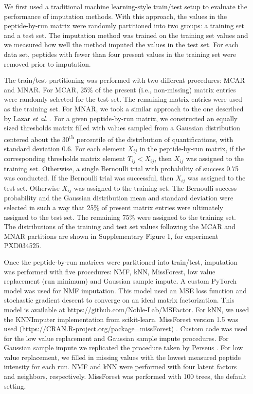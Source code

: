 \documentclass{article}
\begin{document}
We first used a traditional machine learning-style train/test setup to evaluate the performance of imputation methods. With this approach, the values in the peptide-by-run matrix were randomly partitioned into two groups: a training set and a test set.  The imputation method was trained on the training set values and we measured how well the method imputed the values in the test set.  For each data set, peptides with fewer than four present values in the training set were removed prior to imputation.

The train/test partitioning was performed with two different procedures: MCAR and MNAR. For MCAR, 25\% of the present (i.e., non-missing) matrix entries were randomly selected for the test set. The remaining matrix entries were used as the training set.  For MNAR, we took a similar approach to the one described by Lazar \textit{et al.} \cite{lazar}. For a given peptide-by-run matrix, we constructed an equally sized thresholds matrix filled with values sampled from a Gaussian distribution centered about the 30\textsuperscript{th} percentile of the distribution of quantifications, with standard deviation 0.6. For each element $X_{ij}$ in the peptide-by-run matrix, if the corresponding thresholds matrix element $T_{ij} < X_{ij}$, then $X_{ij}$ was assigned to the training set. Otherwise, a single Bernoulli trial with probability of success 0.75 was conducted.  If the Bernoulli trial was successful, then $X_{ij}$ was assigned to the test set. Otherwise $X_{ij}$ was assigned to the training set. The Bernoulli success probability and the Gaussian distribution mean and standard deviation were selected in such a way that 25\% of present matrix entries were ultimately assigned to the test set. The remaining 75\% were assigned to the training set. The distributions of the training and test set values following the MCAR and MNAR partitions are shown in Supplementary Figure 1, for experiment PXD034525.

Once the peptide-by-run matrices were partitioned into train/test, imputation was performed with five procedures: NMF, kNN, MissForest, low value replacement (run minimum) and Gaussian sample impute. A custom PyTorch model was used for NMF imputation. This model used an MSE loss function and stochastic gradient descent to converge on an ideal matrix factorization. This model is available at \url{https://github.com/Noble-Lab/MSFactor}. For kNN, we used the KNNImputer implementation from scikit-learn. MissForest version 1.5 was used (\url{https://CRAN.R-project.org/package=missForest}) \cite{missForest}. Custom code was used for the low value replacement and Gaussian sample impute procedures. For Gaussian sample impute we replicated the procedure taken by Perseus \cite{Perseus}. For low value replacement, we filled in missing values with the lowest measured peptide intensity for each run. NMF and kNN were performed with four latent factors and neighbors, respectively. MissForest was performed with 100 trees, the default setting.
\end{document}
